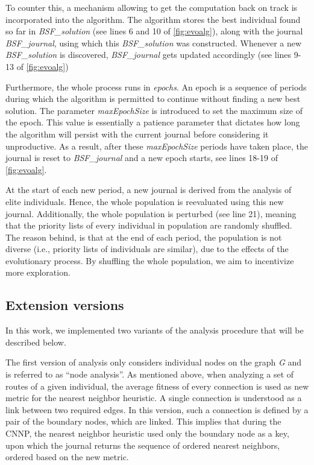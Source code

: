 \documentclass[twoside]{ctuthesis}
\theoremstyle{plain}
\theoremstyle{definition}
\theoremstyle{note}
\begin{document}
To counter this, a mechanism allowing to get the computation back on track is incorporated into the algorithm. The algorithm stores the best individual found so far in \emph{BSF\_solution} (see lines 6 and 10 of \ref{fig:evoalg}), along with the journal \emph{BSF\_journal}, using which this \emph{BSF\_solution} was constructed. Whenever a new \emph{BSF\_solution} is discovered, \emph{BSF\_journal} gets updated accordingly (see lines 9-13 of \ref{fig:evoalg})

Furthermore, the whole process runs in \emph{epochs}. An epoch is a sequence of periods during which the algorithm is permitted to continue without finding a new best solution. The parameter \emph{maxEpochSize} is introduced to set the maximum size of the epoch. This value is essentially a patience parameter that dictates how long the algorithm will persist with the current journal before considering it unproductive. As a result, after these \emph{maxEpochSize} periods have taken place, the journal is reset to \emph{BSF\_journal} and a new epoch starts, see lines 18-19 of \ref{fig:evoalg}.

At the start of each new period, a new journal is derived from the analysis of elite individuals. Hence, the whole population is reevaluated using this new journal. Additionally, the whole population is perturbed (see line 21), meaning that the priority lists of every individual in population are randomly shuffled. The reason behind, is that at the end of each period, the population is not diverse (i.e., priority lists of individuals are similar), due to the effects of the evolutionary process. By shuffling the whole population, we aim to incentivize more exploration.


\subsection{Extension versions}
\label{sec:extensionversions}
In this work, we implemented two variants of the analysis procedure that will be described below.

The first version of analysis only considers individual nodes on the graph \emph{G} and is referred to as ``node analysis''. As mentioned above, when analyzing a set of routes of a given individual, the average fitness of every connection is used as new metric for the nearest neighbor heuristic. A single connection is understood as a link between two required edges. 
In this version, such a connection is defined by a pair of the boundary nodes, which are linked. This implies that during the CNNP, the nearest neighbor heuristic used only the boundary node as a key, upon which the journal returns the sequence of ordered nearest neighbors, ordered based on the new metric.
\end{document}
